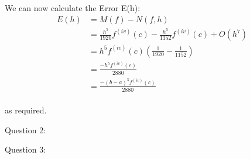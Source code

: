 \documentclass[fleqn]{report}
\begin{document}
We can now calculate the Error E(h):
\begin{equation}
\begin{split}
E(h) & =M(f) - N(f,h)\\
& = \frac{h^5}{1920}f^{(iv)}(c) -  \frac{h^5}{1152}f^{(iv)}(c) + O(h^7) \\
& = h^5f^{(iv)}(c)(\frac{1}{1920} - \frac{1}{1152})\\
& = \frac{-h^5f^{(iv)}(c)}{2880}\\
& = \frac{-(b-a)^5f^{(iv)}(c)}{2880}
\end{split}
\end{equation}
\\
as required.

Question 2:


Question 3:
\end{document}
